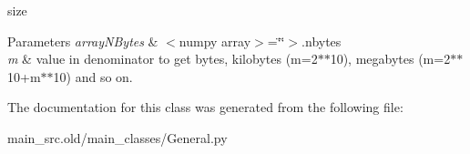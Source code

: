 size 


\begin{DoxyParams}{Parameters}
{\em array\-N\-Bytes} & $<$numpy array$>$=\char`\"{}\char`\"{}$>$.nbytes \\
\hline
{\em m} & value in denominator to get bytes, kilobytes (m=2$\ast$$\ast$10), megabytes (m=2$\ast$$\ast$10+m$\ast$$\ast$10) and so on. \\
\hline
\end{DoxyParams}


The documentation for this class was generated from the following file\-:\begin{DoxyCompactItemize}
\item 
main\-\_\-src.\-old/main\-\_\-classes/General.\-py\end{DoxyCompactItemize}
